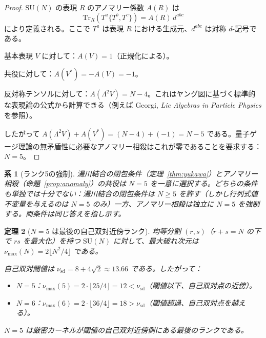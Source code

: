 \documentclass[12pt]{article}
\theoremstyle{plain}
\newtheorem{theorem}{定理}[section]
\newtheorem{corollary}[theorem]{系}
\theoremstyle{definition}
\numberwithin{equation}{section}
\begin{document}
\begin{proof}
$\mathrm{SU}(N)$ の表現 $R$ のアノマリー係数 $A(R)$ は
\begin{equation}
\mathrm{Tr}_R(T^a\{T^b,T^c\}) = A(R)\,d^{abc}
\end{equation}
により定義される。ここで $T^a$ は表現 $R$ における生成元、$d^{abc}$ は対称 $d$-記号である。

基本表現 $V$ に対して：$A(V)=1$（正規化による）。

共役に対して：$A(V^*)=-A(V)=-1$。

反対称テンソルに対して：$A(\Lambda^2 V)=N-4$。これはヤング図に基づく標準的な表現論の公式から計算できる（例えば Georgi, \emph{Lie Algebras in Particle Physics} を参照）。

したがって $A(\Lambda^2 V)+A(V^*)=(N-4)+(-1)=N-5$ である。量子ゲージ理論の無矛盾性に必要なアノマリー相殺はこれが零であることを要求する：$N=5$。
\end{proof}

\begin{corollary}[ランク5の強制]\label{cor:rank5}
湯川結合の閉包条件（定理~\ref{thm:yukawa}）とアノマリー相殺（命題~\ref{prop:anomaly}）の共役は $N=5$ を一意に選択する。どちらの条件も単独では十分でない：湯川結合の閉包条件は $N\geq 5$ を許す（しかし行列式値不変量を与えるのは $N=5$ のみ）一方、アノマリー相殺は独立に $N=5$ を強制する。両条件は同じ答えを指し示す。
\end{corollary}

\begin{theorem}[$N=5$ は最後の自己双対近傍ランク]\label{thm:lastrank}
均等分割 $(r,s)$（$r+s=N$ の下で $rs$ を最大化）を持つ $\mathrm{SU}(N)$ に対して、最大破れ次元は $\nu_{\max}(N)=2\lfloor N^2/4\rfloor$ である。

自己双対閾値は $\nu_{\mathrm{sd}}=8+4\sqrt{2}\approx 13.66$ である。したがって：
\begin{itemize}
\item $N=5$：$\nu_{\max}(5)=2\cdot\lfloor 25/4\rfloor=12<\nu_{\mathrm{sd}}$（閾値以下、自己双対点の近傍）。
\item $N=6$：$\nu_{\max}(6)=2\cdot\lfloor 36/4\rfloor=18>\nu_{\mathrm{sd}}$（閾値超過、自己双対点を越える）。
\end{itemize}
$N=5$ は厳密カーネルが閾値の自己双対近傍側にある\emph{最後の}ランクである。
\end{theorem}
\end{document}
